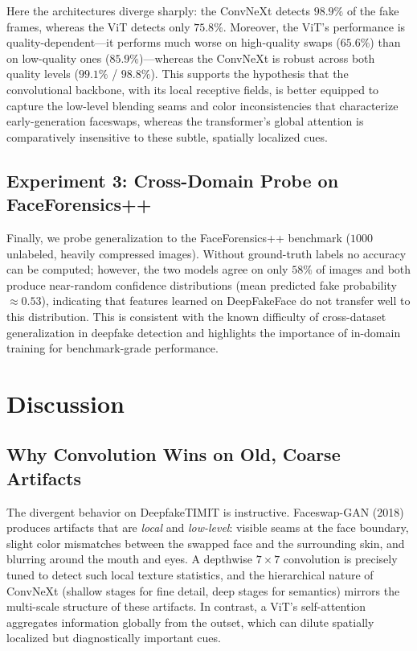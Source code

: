 \documentclass[11pt,a4paper]{article}
\begin{document}
Here the architectures diverge sharply: the ConvNeXt detects $98.9\%$ of the fake frames, whereas
the ViT detects only $75.8\%$. Moreover, the ViT's performance is quality-dependent---it performs
much worse on high-quality swaps ($65.6\%$) than on low-quality ones ($85.9\%$)---whereas the
ConvNeXt is robust across both quality levels ($99.1\%$ / $98.8\%$). This supports the hypothesis
that the convolutional backbone, with its local receptive fields, is better equipped to capture the
low-level blending seams and color inconsistencies that characterize early-generation faceswaps,
whereas the transformer's global attention is comparatively insensitive to these subtle, spatially
localized cues.

\subsection{Experiment 3: Cross-Domain Probe on FaceForensics++}
Finally, we probe generalization to the FaceForensics++ benchmark ($1000$ unlabeled, heavily
compressed images). Without ground-truth labels no accuracy can be computed; however, the two
models agree on only $58\%$ of images and both produce near-random confidence distributions
(mean predicted fake probability $\approx0.53$), indicating that features learned on DeepFakeFace
do not transfer well to this distribution. This is consistent with the known difficulty of
cross-dataset generalization in deepfake detection and highlights the importance of in-domain
training for benchmark-grade performance.

\section{Discussion}

\subsection{Why Convolution Wins on Old, Coarse Artifacts}
The divergent behavior on DeepfakeTIMIT is instructive. Faceswap-GAN (2018) produces artifacts
that are \emph{local} and \emph{low-level}: visible seams at the face boundary, slight color
mismatches between the swapped face and the surrounding skin, and blurring around the mouth and
eyes. A depthwise $7\times7$ convolution is precisely tuned to detect such local texture
statistics, and the hierarchical nature of ConvNeXt (shallow stages for fine detail, deep stages
for semantics) mirrors the multi-scale structure of these artifacts. In contrast, a ViT's
self-attention aggregates information globally from the outset, which can dilute spatially
localized but diagnostically important cues.
\end{document}
